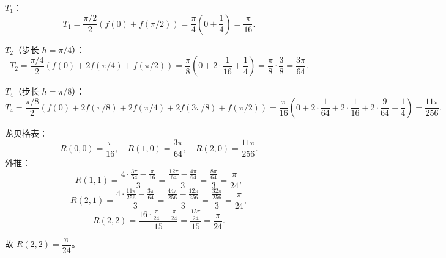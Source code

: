 \documentclass{article}
\begin{document}
\(T_1\)：
  \[
  T_1 = \frac{\pi/2}{2}\left(f(0)+f(\pi/2)\right) = \frac{\pi}{4}\left(0+\frac{1}{4}\right) = \frac{\pi}{16}.
  \]

\(T_2\)（步长 \(h=\pi/4\)）：
  \[
  T_2 = \frac{\pi/4}{2}\left(f(0)+2f(\pi/4)+f(\pi/2)\right) = \frac{\pi}{8}\left(0+2\cdot\frac{1}{16}+\frac{1}{4}\right) = \frac{\pi}{8}\cdot\frac{3}{8} = \frac{3\pi}{64}.
  \]

\(T_4\)（步长 \(h=\pi/8\)）：
  \[
  T_4 = \frac{\pi/8}{2}\left(f(0)+2f(\pi/8)+2f(\pi/4)+2f(3\pi/8)+f(\pi/2)\right) = \frac{\pi}{16}\left(0+2\cdot\frac{1}{64}+2\cdot\frac{1}{16}+2\cdot\frac{9}{64}+\frac{1}{4}\right) = \frac{11\pi}{256}.
  \]

龙贝格表：
\[
R(0,0)=\frac{\pi}{16},\quad R(1,0)=\frac{3\pi}{64},\quad R(2,0)=\frac{11\pi}{256}.
\]
外推：
\[
R(1,1)=\frac{4\cdot\frac{3\pi}{64}-\frac{\pi}{16}}{3}=\frac{\frac{12\pi}{64}-\frac{4\pi}{64}}{3}=\frac{\frac{8\pi}{64}}{3}=\frac{\pi}{24},
\]
\[
R(2,1)=\frac{4\cdot\frac{11\pi}{256}-\frac{3\pi}{64}}{3}=\frac{\frac{44\pi}{256}-\frac{12\pi}{256}}{3}=\frac{\frac{32\pi}{256}}{3}=\frac{\pi}{24},
\]
\[
R(2,2)=\frac{16\cdot\frac{\pi}{24}-\frac{\pi}{24}}{15}=\frac{\frac{15\pi}{24}}{15}=\frac{\pi}{24}.
\]

故 \(R(2,2)=\dfrac{\pi}{24}\)。
\end{document}
